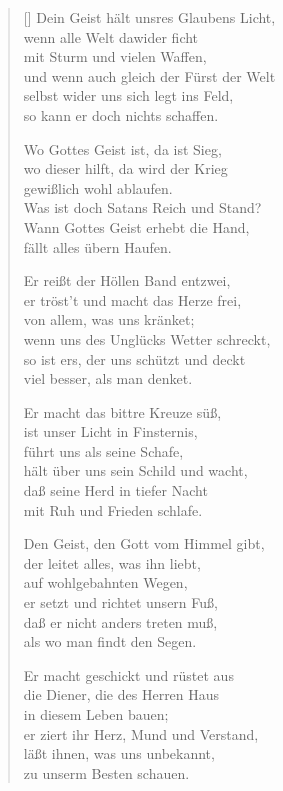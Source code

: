 \begin{multicols}{2}
\begin{verse}[\versewidth]
 Dein Geist hält unsres Glaubens Licht,\\
wenn alle Welt dawider ficht\\
mit Sturm und vielen Waffen,\\
und wenn auch gleich der Fürst der Welt\\
selbst wider uns sich legt ins Feld,\\
so kann er doch nichts schaffen.

 Wo Gottes Geist ist, da ist Sieg,\\
wo dieser hilft, da wird der Krieg\\
gewißlich wohl ablaufen.\\
Was ist doch Satans Reich und Stand?\\
Wann Gottes Geist erhebt die Hand,\\
fällt alles übern Haufen.

 Er reißt der Höllen Band entzwei,\\
er tröst't und macht das Herze frei,\\
von allem, was uns kränket;\\
wenn uns des Unglücks Wetter schreckt,\\
so ist ers, der uns schützt und deckt\\
viel besser, als man denket.

 Er macht das bittre Kreuze süß,\\
ist unser Licht in Finsternis,\\
führt uns als seine Schafe,\\
hält über uns sein Schild und wacht,\\
daß seine Herd in tiefer Nacht\\
mit Ruh und Frieden schlafe.

 Den Geist, den Gott vom Himmel gibt,\\
der leitet alles, was ihn liebt,\\
auf wohlgebahnten Wegen,\\
er setzt und richtet unsern Fuß,\\
daß er nicht anders treten muß,\\
als wo man findt den Segen.

 Er macht geschickt und rüstet aus\\
die Diener, die des Herren Haus\\
in diesem Leben bauen;\\
er ziert ihr Herz, Mund und Verstand,\\
läßt ihnen, was uns unbekannt,\\
zu unserm Besten schauen.


\end{verse}
\end{multicols}
